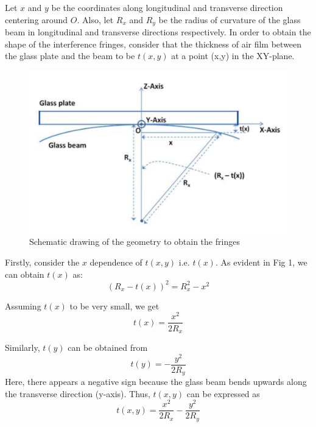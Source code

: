Let $x$ and $y$ be the coordinates along longitudinal and transverse direction centering around $O$. Also, let $R_x$ and $R_y$ be the radius of curvature of the glass beam in longitudinal and transverse directions respectively. In order to obtain the shape of the interference fringes, consider that the thickness of air film between the glass plate and the beam to be $t(x,y)$ at a point (x,y) in the XY-plane. 

\begin{figure}[H]
    \centering
    \label{fig:1}
    \includegraphics[width=1\columnwidth]{images/f1.png}
    \caption{Schematic drawing of the geometry to obtain the fringes}
\end{figure}

Firstly, consider the $x$ dependence of $t(x,y)$ i.e. $t(x)$. As evident in Fig 1, we can obtain $t(x)$ as:
\begin{equation}
    (R_x - t(x))^2 = R_x^2 - x^2
\end{equation}

Assuming $t(x)$ to be very small, we get
\begin{equation}
    t(x) = \frac{x^2}{2R_x}
\end{equation}

Similarly, $t(y)$ can be obtained from
\begin{equation}
    t(y) = -\frac{y^2}{2R_y}
\end{equation}
Here, there appears a negative sign because the glass beam bends upwards along the transverse direction (y-axis). Thus, $t(x, y)$ can be expressed as
\begin{equation}
    t(x, y)=\frac{x^2}{2R_x}-\frac{y^2}{2R_y}
\end{equation}

